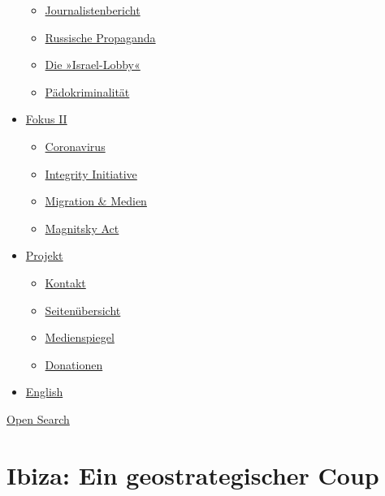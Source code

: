 \begin{itemize}
  \begin{itemize}
  \tightlist
  \item
    \href{https://swprs.org/bericht-eines-journalisten/}{Journalistenbericht}
  \item
    \href{https://swprs.org/russische-propaganda/}{Russische Propaganda}
  \item
    \href{https://swprs.org/die-israel-lobby-fakten-und-mythen/}{Die
    »Israel-Lobby«}
  \item
    \href{https://swprs.org/geopolitik-und-paedokriminalitaet/}{Pädokriminalität}
  \end{itemize}
\item
  \href{https://swprs.org/migration-und-medien/}{Fokus II}

  \begin{itemize}
  \tightlist
  \item
    \href{https://swprs.org/covid-19-hinweis-ii/}{Coronavirus}
  \item
    \href{https://swprs.org/die-integrity-initiative/}{Integrity
    Initiative}
  \item
    \href{https://swprs.org/migration-und-medien/}{Migration \& Medien}
  \item
    \href{https://swprs.org/der-fall-magnitsky/}{Magnitsky Act}
  \end{itemize}
\item
  \href{https://swprs.org/kontakt/}{Projekt}

  \begin{itemize}
  \tightlist
  \item
    \href{https://swprs.org/kontakt/}{Kontakt}
  \item
    \href{https://swprs.org/uebersicht/}{Seitenübersicht}
  \item
    \href{https://swprs.org/medienspiegel/}{Medienspiegel}
  \item
    \href{https://swprs.org/donationen/}{Donationen}
  \end{itemize}
\item
  \href{https://swprs.org/contact/}{English}
\end{itemize}

\protect\hyperlink{}{Open Search}

\hypertarget{ibiza-ein-geostrategischer-coup}{%
\section{Ibiza: Ein geostrategischer
Coup}\label{ibiza-ein-geostrategischer-coup}}


